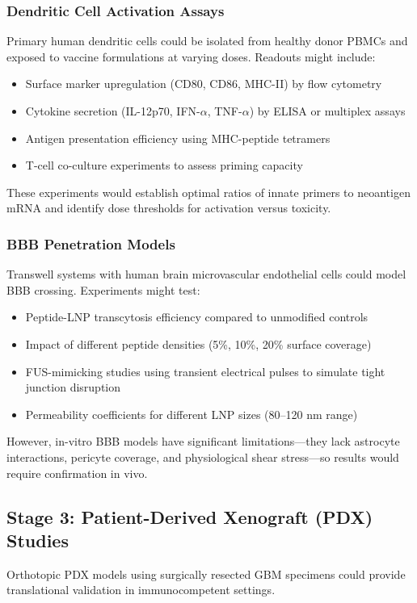 \documentclass[12pt]{article}
\begin{document}
\subsubsection{Dendritic Cell Activation Assays}
Primary human dendritic cells could be isolated from healthy donor PBMCs and exposed to vaccine formulations at varying doses. Readouts might include:
\begin{itemize}[leftmargin=*,noitemsep]
\item Surface marker upregulation (CD80, CD86, MHC-II) by flow cytometry
\item Cytokine secretion (IL-12p70, IFN-$\alpha$, TNF-$\alpha$) by ELISA or multiplex assays
\item Antigen presentation efficiency using MHC-peptide tetramers
\item T-cell co-culture experiments to assess priming capacity
\end{itemize}

These experiments would establish optimal ratios of innate primers to neoantigen mRNA and identify dose thresholds for activation versus toxicity.

\subsubsection{BBB Penetration Models}
Transwell systems with human brain microvascular endothelial cells could model BBB crossing. Experiments might test:
\begin{itemize}[leftmargin=*,noitemsep]
\item Peptide-LNP transcytosis efficiency compared to unmodified controls
\item Impact of different peptide densities (5\%, 10\%, 20\% surface coverage)
\item FUS-mimicking studies using transient electrical pulses to simulate tight junction disruption
\item Permeability coefficients for different LNP sizes (80--120 nm range)
\end{itemize}

However, in-vitro BBB models have significant limitations—they lack astrocyte interactions, pericyte coverage, and physiological shear stress—so results would require confirmation in vivo.

\subsection{Stage 3: Patient-Derived Xenograft (PDX) Studies}
Orthotopic PDX models using surgically resected GBM specimens could provide translational validation in immunocompetent settings.
\end{document}
